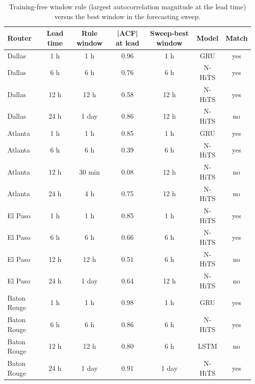 \begin{table}[t]
\caption{Training-free window rule (largest autocorrelation magnitude at the lead time) versus the best window in the forecasting sweep.}
\label{tab:window_rule}
\centering
\begin{tabular}{lcccccc}
\hline
\textbf{Router} & \textbf{Lead time} & \textbf{Rule window} & \textbf{|ACF| at lead} & \textbf{Sweep-best window} & \textbf{Model} & \textbf{Match} \\
\hline
Dallas & 1 h & 1 h & 0.96 & 1 h & GRU & yes \\
Dallas & 6 h & 6 h & 0.76 & 6 h & N-HiTS & yes \\
Dallas & 12 h & 12 h & 0.58 & 12 h & N-HiTS & yes \\
Dallas & 24 h & 1 day & 0.86 & 12 h & N-HiTS & no \\
Atlanta & 1 h & 1 h & 0.85 & 1 h & GRU & yes \\
Atlanta & 6 h & 6 h & 0.39 & 6 h & N-HiTS & yes \\
Atlanta & 12 h & 30 min & 0.08 & 12 h & N-HiTS & no \\
Atlanta & 24 h & 4 h & 0.75 & 12 h & N-HiTS & no \\
El Paso & 1 h & 1 h & 0.85 & 1 h & N-HiTS & yes \\
El Paso & 6 h & 6 h & 0.66 & 6 h & N-HiTS & yes \\
El Paso & 12 h & 12 h & 0.51 & 6 h & N-HiTS & no \\
El Paso & 24 h & 1 day & 0.64 & 12 h & N-HiTS & no \\
Baton Rouge & 1 h & 1 h & 0.98 & 1 h & GRU & yes \\
Baton Rouge & 6 h & 6 h & 0.86 & 6 h & N-HiTS & yes \\
Baton Rouge & 12 h & 12 h & 0.80 & 6 h & LSTM & no \\
Baton Rouge & 24 h & 1 day & 0.91 & 1 day & N-HiTS & yes \\
\hline
\end{tabular}
\end{table}
